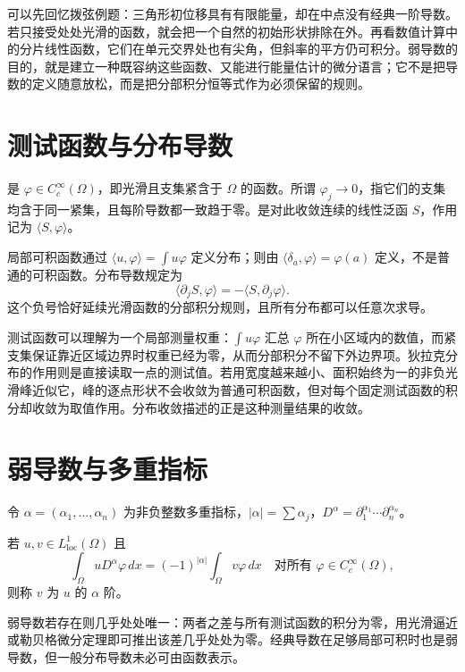 \documentclass[UTF8,12pt,a4paper,fontset=fandol]{ctexbook}
\begin{document}
可以先回忆拨弦例题：三角形初位移具有有限能量，却在中点没有经典一阶导数。若只接受处处光滑的函数，就会把一个自然的初始形状排除在外。再看数值计算中的分片线性函数，它们在单元交界处也有尖角，但斜率的平方仍可积分。弱导数的目的，就是建立一种既容纳这些函数、又能进行能量估计的微分语言；它不是把导数的定义随意放松，而是把分部积分恒等式作为必须保留的规则。

\section{测试函数与分布导数}
是 $\varphi\in C_c^\infty(\Omega)$，即光滑且支集紧含于 $\Omega$ 的函数。所谓 $\varphi_j\to0$，指它们的支集均含于同一紧集，且每阶导数都一致趋于零。是对此收敛连续的线性泛函 $S$，作用记为 $\langle S,\varphi\rangle$。

局部可积函数通过 $\langle u,\varphi\rangle=\int u\varphi$ 定义分布；则由 $\langle\delta_a,\varphi\rangle=\varphi(a)$ 定义，不是普通的可积函数。分布导数规定为
\[
 \langle\partial_jS,\varphi\rangle=-\langle S,\partial_j\varphi\rangle.
\]
这个负号恰好延续光滑函数的分部积分规则，且所有分布都可以任意次求导。

测试函数可以理解为一个局部测量权重：$\int u\varphi$ 汇总 $\varphi$ 所在小区域内的数值，而紧支集保证靠近区域边界时权重已经为零，从而分部积分不留下外边界项。狄拉克分布的作用则是直接读取一点的测试值。若用宽度越来越小、面积始终为一的非负光滑峰近似它，峰的逐点形状不会收敛为普通可积函数，但对每个固定测试函数的积分却收敛为取值作用。分布收敛描述的正是这种测量结果的收敛。

\section{弱导数与多重指标}
令 $\alpha=(\alpha_1,\ldots,\alpha_n)$ 为非负整数多重指标，$|\alpha|=\sum\alpha_j$，$D^\alpha=\partial_1^{\alpha_1}\cdots\partial_n^{\alpha_n}$。
\begin{definition}
若 $u,v\in L^1_{\mathrm{loc}}(\Omega)$ 且
\begin{equation}
 \int_\Omega uD^\alpha\varphi\,dx=(-1)^{|\alpha|}\int_\Omega v\varphi\,dx
 \quad\text{对所有 }\varphi\in C_c^\infty(\Omega),
 \label{eq:weak-derivative}
\end{equation}
则称 $v$ 为 $u$ 的 $\alpha$ 阶。
\end{definition}
弱导数若存在则几乎处处唯一：两者之差与所有测试函数的积分为零，用光滑逼近或勒贝格微分定理即可推出该差几乎处处为零。经典导数在足够局部可积时也是弱导数，但一般分布导数未必可由函数表示。
\end{document}
